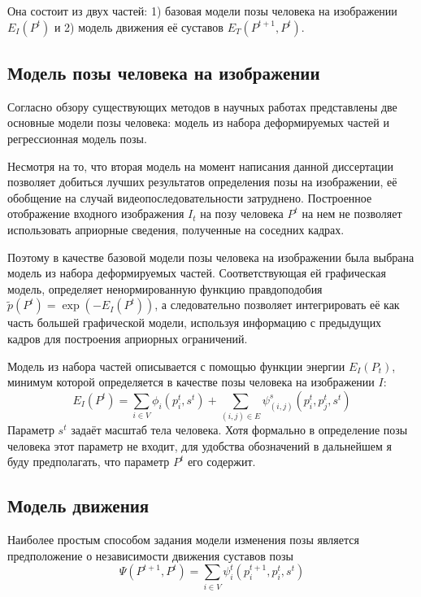 Она состоит из двух частей: 1) базовая модели позы человека на изображении $E_I(P^t)$ и 2) модель движения её суставов $E_T(P^{t+1}, P^{t})$.

\subsection{Модель позы человека на изображении}

Согласно обзору существующих методов в научных работах представлены две основные модели позы человека: модель из набора деформируемых частей и регрессионная модель позы.

Несмотря на то, что вторая модель на момент написания данной диссертации позволяет добиться лучших результатов определения позы на изображении, её обобщение на случай видеопоследовательности затруднено. Построенное отображение входного изображения $I_t$ на позу человека $P^t$ на нем не позволяет использовать априорные сведения, полученные на соседних кадрах.

Поэтому в качестве базовой модели позы человека на изображении была выбрана модель из набора деформируемых частей. Соответствующая ей графическая модель, определяет ненормированную функцию правдоподобия $\tilde{p}(P^t) = \exp(-E_I(P^t))$, а следовательно позволяет интегрировать её как часть большей графической модели, используя информацию с предыдущих кадров для построения априорных ограничений.

Модель из набора частей описывается с помощью функции энергии $E_I(P_t)$, минимум которой определяется в качестве позы человека на изображении $I$:
\begin{equation}
	E_I(P^t) = \sum_{i\in V}{\phi_i(p_i^t, s^t)} + \sum_{\left(i,j\right)\in E}{\psi_{(i,j)}^s(p_i^t, p_j^t, s^t)}
	\label{eq::frame}
\end{equation}
Параметр $s^t$ задаёт масштаб тела человека. Хотя формально в определение позы человека этот параметр не входит, для удобства обозначений в дальнейшем я буду предполагать, что параметр $P^t$ его содержит.

\subsection{Модель движения}


Наиболее простым способом задания модели изменения позы является предположение о независимости движения суставов позы
\begin{equation}
	\Psi(P^{t+1}, P^{t}) = \sum_{i\in V}\psi_i^t(p_i^{t+1}, p_i^t, s^t)
\end{equation}

